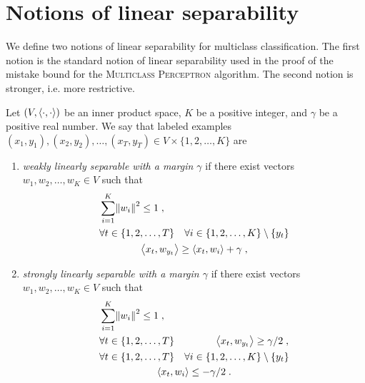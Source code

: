 \section{Notions of linear separability}
\label{section:notions-of-linear-separability}

We define two notions of linear separability for multiclass classification. The
first notion is the standard notion of linear separability used in the proof of
the mistake bound for the \textsc{Multiclass Perceptron} algorithm. The second
notion is stronger, i.e. more restrictive. %

\begin{definition}
\label{definition:linear-separability}
Let $(V,\left\langle \cdot, \cdot \right\rangle)$ be an inner product space, $K$ be a positive
integer, and $\gamma$ be a positive real number.
We say that labeled examples $(x_1, y_1),
(x_2, y_2), \dots, (x_T, y_T) \in V \times \{1,2,\dots,K\}$ are
\begin{enumerate}
\item
\emph{weakly linearly separable with a margin $\gamma$} if there exist vectors
$w_1, w_2, \dots, w_K \in V$ such that
\begin{align}
\label{equation:weak-linear-separability-1}
& \sum_{i=1}^K \norm{w_i}^2 \le 1 \; , \\
\label{equation:weak-linear-separability-2}
& \begin{gathered}
\forall t \in \{1,2,\dots,T\} \quad \forall i \in \{1,2,\dots, K\} \setminus \{y_t\} \\
\left\langle x_t, w_{y_t} \right\rangle \ge \left\langle x_t, w_i \right\rangle + \gamma \; ,
\end{gathered}
\end{align}
\item
\emph{strongly linearly separable with a margin $\gamma$} if there exist vectors
$w_1, w_2, \dots, w_K \in V$ such that
\begin{align}
\label{equation:strong-linear-separability-1}
& \sum_{i=1}^K \norm{w_i}^2 \le 1 \; , \\
\label{equation:strong-linear-separability-2}
& \forall t \in \{1,2,\dots,T\} \qquad \qquad \left\langle x_t, w_{y_t} \right\rangle \ge \gamma/2 \; , \\
\label{equation:strong-linear-separability-3}
& \begin{gathered}
\forall t \in \{1,2,\dots,T\} \quad \forall i \in \{1,2,\dots, K\} \setminus \{y_t\} \\
\left\langle x_t, w_i \right\rangle \le - \gamma/2 \; .
\end{gathered}
\end{align}
\end{enumerate}
\end{definition}

